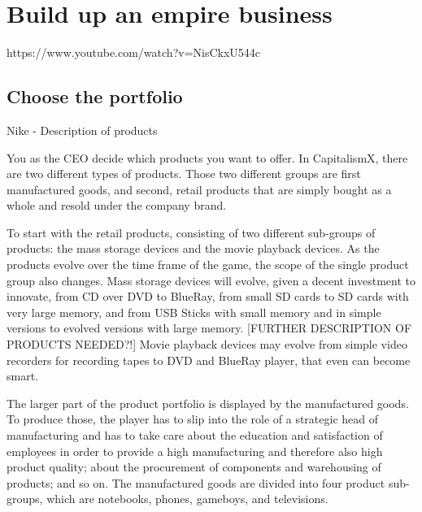 \documentclass[11pt,titlepage,oneside,openany]{book}
\begin{document}
 
 
%







\section{Build up an empire business}
\label{sec:business}
https://www.youtube.com/watch?v=NisCkxU544c
\subsection{Choose the portfolio}
Nike - Description of products 

You as the CEO decide which products you want to offer. In CapitalismX, there are two different types of products. Those two different groups are first manufactured goods, and second, retail products that are simply bought as a whole and resold under the company brand.

To start with the retail products, consisting of two different sub-groups of products: the mass storage devices and the movie playback devices. As the products evolve over the time frame of the game, the scope of the single product group also changes. Mass storage devices will evolve, given a decent investment to innovate, from CD over DVD to BlueRay, from small SD cards to SD cards with very large memory, and from USB Sticks with small memory and in simple versions to evolved versions with large memory. [FURTHER DESCRIPTION OF PRODUCTS NEEDED?!] Movie playback devices may evolve from simple video recorders for recording tapes to DVD and BlueRay player, that even can become smart. 

The larger part of the product portfolio is displayed by the manufactured goods. To produce those, the player has to slip into the role of a strategic head of manufacturing and has to take care about the education and satisfaction of employees in order to provide a high manufacturing and therefore also high product quality; about the procurement of components and warehousing of products; and so on.
The manufactured goods are divided into four product sub-groups, which are notebooks, phones, gameboys, and televisions. 
\end{document}

